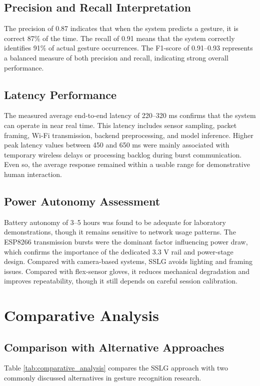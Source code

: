 \documentclass[12pt,a4paper]{report}
\begin{document}
\subsection{Precision and Recall Interpretation}
The precision of 0.87 indicates that when the system predicts a gesture, it is correct 87\% of the time. The recall of 0.91 means that the system correctly identifies 91\% of actual gesture occurrences. The F1-score of 0.91--0.93 represents a balanced measure of both precision and recall, indicating strong overall performance.

\subsection{Latency Performance}
The measured average end-to-end latency of 220--320 ms confirms that the system can operate in near real time. This latency includes sensor sampling, packet framing, Wi-Fi transmission, backend preprocessing, and model inference. Higher peak latency values between 450 and 650 ms were mainly associated with temporary wireless delays or processing backlog during burst communication. Even so, the average response remained within a usable range for demonstrative human interaction.

\subsection{Power Autonomy Assessment}
Battery autonomy of 3--5 hours was found to be adequate for laboratory demonstrations, though it remains sensitive to network usage patterns. The ESP8266 transmission bursts were the dominant factor influencing power draw, which confirms the importance of the dedicated 3.3 V rail and power-stage design. Compared with camera-based systems, SSLG avoids lighting and framing issues. Compared with flex-sensor gloves, it reduces mechanical degradation and improves repeatability, though it still depends on careful session calibration.

\section{Comparative Analysis}
\label{sec:results_comparison}

\subsection{Comparison with Alternative Approaches}
Table \ref{tab:comparative_analysis} compares the SSLG approach with two commonly discussed alternatives in gesture recognition research.
\end{document}
